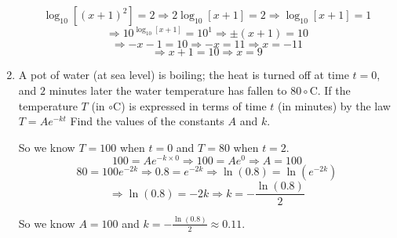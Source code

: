 \documentclass{article}
\begin{document}
\begin{enumerate}
\[\log_{10}\left[{(x + 1)}^{2}\right]=2 \Longrightarrow 2\log_{10}\left[x + 1\right] = 2
    \Longrightarrow \log_{10}\left[x + 1\right] = 1\]
\[\Longrightarrow 10^{\log_{10}\left[x + 1\right]} = 10^{1}
    \Longrightarrow \pm(x + 1) = 10\]
\[\Longrightarrow -x - 1 = 10 \Longrightarrow -x = 11 \Longrightarrow x = -11\]
\[\Longrightarrow x + 1 = 10 \Longrightarrow x = 9\]

\item A pot of water (at sea level) is boiling; the heat is turned off at time $t = 0$,
and $2$ minutes later the water temperature has fallen to $80\circ$C. If the temperature
$T$ (in $\circ$C) is expressed in terms of time $t$ (in minutes) by the law $T = Ae^{-kt}$
Find the values of the constants $A$ and $k$.

So we know $T = 100$ when $t = 0$ and $T = 80$ when $t = 2$.
\[100 = Ae^{-k\times 0} \Longrightarrow 100 = Ae^{0} \Longrightarrow A = 100\]
\[80 = 100e^{-2k} \Longrightarrow 0.8 = e^{-2k} \Longrightarrow \ln(0.8) = \ln\left(e^{-2k}\right)\]
\[\Longrightarrow \ln(0.8) = -2k \Longrightarrow k = -\frac{\ln(0.8)}{2}\]

So we know $A = 100$ and $k = -\frac{\ln(0.8)}{2} \approx 0.11$.
\end{enumerate}
\end{document}
